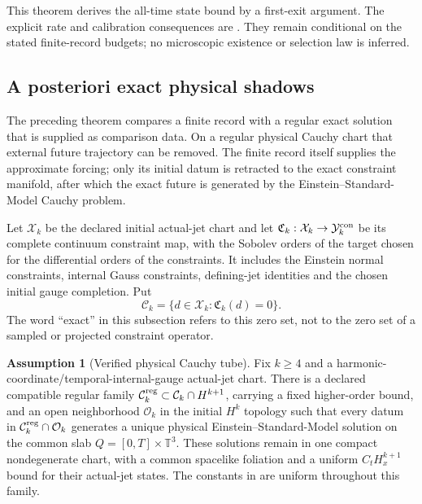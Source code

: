\documentclass[11pt]{article}
\numberwithin{equation}{section}
\theoremstyle{definition}
\newtheorem{assumption}[assumption]{Assumption}
\theoremstyle{remark}
\begin{document}
This theorem derives the all-time state bound by a first-exit argument.
The explicit rate and calibration consequences are
. They remain
conditional on the stated finite-record budgets; no microscopic existence
or selection law is inferred.

\subsection{A posteriori exact physical shadows}
\label{subsec:aposteriori-shadow}

The preceding theorem compares a finite record with a regular exact solution
that is supplied as comparison data.  On a regular physical Cauchy chart that
external future trajectory can be removed.  The finite record itself supplies
the approximate forcing; only its initial datum is retracted to the exact
constraint manifold, after which the exact future is generated by the
Einstein--Standard-Model Cauchy problem.

Let $\mathcal X_k$ be the declared initial actual-jet chart and let
$\mathfrak C_k:\mathcal X_k\to\mathcal Y_k^{\rm con}$ be its complete
continuum constraint map, with the Sobolev orders of the target chosen for
the differential orders of the constraints. It includes the Einstein normal
constraints, internal Gauss constraints, defining-jet identities and the
chosen initial gauge completion. Put
\begin{equation}
 \mathcal C_k=\{d\in\mathcal X_k:\mathfrak C_k(d)=0\}.
 \label{eq:exact-physical-initial-manifold}
\end{equation}
The word ``exact'' in this subsection refers to this zero set, not to the
zero set of a sampled or projected constraint operator.

\begin{assumption}[Verified physical Cauchy tube]
\label{ass:physical-Cauchy-tube}
Fix $k\ge4$ and a harmonic-coordinate/temporal-internal-gauge actual-jet
chart. There is a declared compatible regular family
$\mathcal C_k^{\rm reg}\subset\mathcal C_k\cap H^{k+1}$, carrying a fixed
higher-order bound, and an open neighborhood $\mathcal O_k$ in the initial
$H^k$ topology such that every datum in
$\mathcal C_k^{\rm reg}\cap\mathcal O_k$ generates a unique physical
Einstein--Standard-Model solution on the common slab
$Q=[0,T]\times\mathbb T^3$. These solutions remain in one compact
nondegenerate chart, with a common spacelike foliation and a uniform
$C_tH_x^{k+1}$ bound for their actual-jet states. The constants in
 are uniform throughout this family.
\end{assumption}
\end{document}
